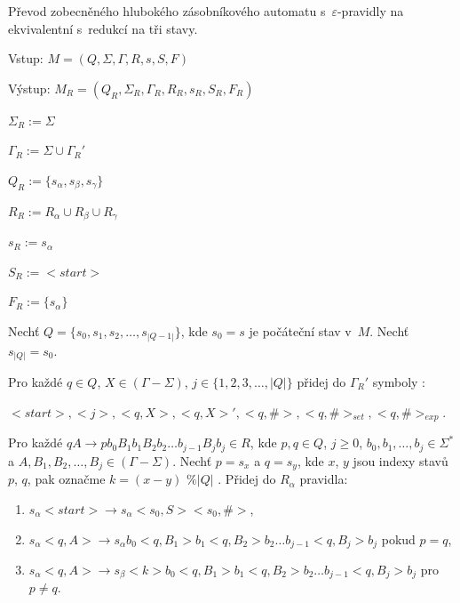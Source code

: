 \begin{Alg}\label{alg_gen_deep_pda_state}
Převod zobecněného hlubokého zásobníkového automatu s~$\varepsilon$-pravidly na ekvivalentní s~redukcí na tři stavy.

\begin{list}{}{\setlength\parsep{0cm} \setlength\itemsep{0cm} \setlength\leftmargin{1em}}
   \item Vstup: $M = (Q,\Sigma,\Gamma, R, s, S, F)$ 
   \item Výstup: $M_{R} = (Q_{R}, \Sigma_{R}, {\Gamma}_{R}, R_{R}, s_{R},  S_{R}, F_{R})$ \medskip

   \item ${\Sigma}_{R} := \Sigma$
   \item ${\Gamma}_{R} := \Sigma \cup {\Gamma}_{R}'$
   \item $Q_{R} := \{s_\alpha, s_\beta, s_\gamma \}$
   \item $R_{R} := R_{\alpha} \cup R_{\beta} \cup R_{\gamma}$
   \item $s_{R} := s_{\alpha} $
   \item $S_{R} := <start> $
   \item $F_{R} := \{s_{\alpha}\} $ \medskip

   \item Nechť $Q = \{s_0, s_1, s_2, \dots,s_{|Q-1|}\}$, kde $s_0 = s$ je počáteční stav v~$M$. Nechť $s_{|Q|} = s_0$.\medskip

   \item Pro každé $q \in Q$, $X \in (\Gamma - \Sigma)$, $j \in \{1,2,3,\dots,|Q|\}$ přidej do ${\Gamma}_{R}'$ symboly :
   \item $<start>, <j>, <q, X>, <q, X>', <q, \#>, <q, \#>_{set}, <q, \#>_{exp}$.\medskip

   \item Pro každé $qA \rightarrow p b_0 B_1 b_1 B_2 b_2 \dots b_{j-1} B_{j} b_j \in R$, kde $p, q \in Q$, $j \ge 0$, $b_0,b_1,\dots,b_j \in {\Sigma}^*$ a $A, B_1,B_2,\dots,B_j \in (\Gamma - \Sigma)$. 
         Nechť $p=s_x$ a $q=s_y$, kde $x$, $y$ jsou indexy stavů $p$, $q$, pak označme $k = (x - y) \textrm{ \% } |Q|$ . 
         Přidej do $R_\alpha$ pravidla:

\begin{enumerate}
\renewcommand{\labelenumi}{(\roman{enumi})}

   \item $s_\alpha <start> \rightarrow s_\alpha <s_0, S> <s_0, \#>$,
   \item  $s_\alpha <q, A> \rightarrow s_\alpha b_0 <q, B_1> b_1 <q, B_2> b_2 \dots b_{j-1} <q, B_j> b_j$ pokud $p = q$,
   \item  $s_\alpha <q, A> \rightarrow s_\beta <k> b_0 <q, B_1> b_1 <q, B_2> b_2 \dots b_{j-1} <q, B_j> b_j$ pro $p \ne q$. 


\end{enumerate}
\end{list}
\end{Alg}

